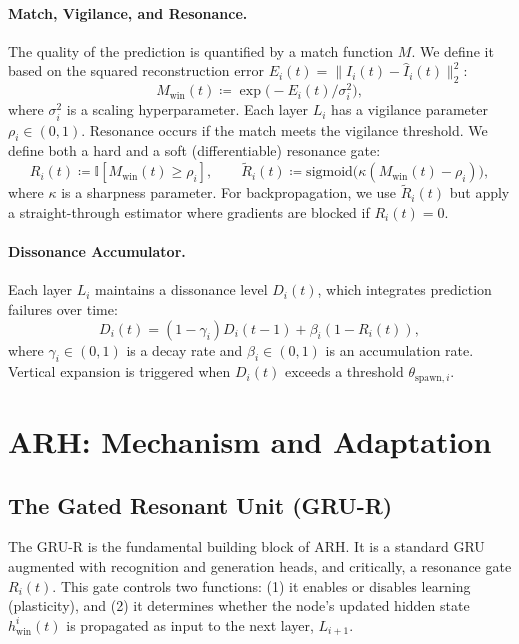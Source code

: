 \documentclass{article}
\begin{document}
\paragraph{Match, Vigilance, and Resonance.} The quality of the prediction is quantified by a match function $M$. We define it based on the squared reconstruction error $E_i(t) = \|I_i(t) - \hat{I}_i(t)\|_2^2$:
\begin{equation}
    M_{\text{win}}(t) \coloneqq \exp\big(-E_i(t) / \sigma_i^2\big),
\end{equation}
where $\sigma_i^2$ is a scaling hyperparameter. Each layer $L_i$ has a vigilance parameter $\rho_i \in (0, 1)$. Resonance occurs if the match meets the vigilance threshold. We define both a hard and a soft (differentiable) resonance gate:
\begin{equation}
    R_i(t) \coloneqq \mathbb{I}[M_{\text{win}}(t) \ge \rho_i], \qquad
    \tilde{R}_i(t) \coloneqq \text{sigmoid}\big(\kappa(M_{\text{win}}(t) - \rho_i)\big),
\end{equation}
where $\kappa$ is a sharpness parameter. For backpropagation, we use $\tilde{R}_i(t)$ but apply a straight-through estimator where gradients are blocked if $R_i(t) = 0$.

\paragraph{Dissonance Accumulator.} Each layer $L_i$ maintains a dissonance level $D_i(t)$, which integrates prediction failures over time:
\begin{equation}
    D_i(t) = (1 - \gamma_i) D_i(t-1) + \beta_i (1 - R_i(t)),
    \label{eq:dissonance}
\end{equation}
where $\gamma_i \in (0,1)$ is a decay rate and $\beta_i \in (0,1)$ is an accumulation rate. Vertical expansion is triggered when $D_i(t)$ exceeds a threshold $\theta_{\text{spawn},i}$.

\section{ARH: Mechanism and Adaptation}

\subsection{The Gated Resonant Unit (GRU-R)}
The GRU-R is the fundamental building block of ARH. It is a standard GRU \citep{gru2014} augmented with recognition and generation heads, and critically, a resonance gate $R_i(t)$. This gate controls two functions: (1) it enables or disables learning (plasticity), and (2) it determines whether the node's updated hidden state $h_{\text{win}}^i(t)$ is propagated as input to the next layer, $L_{i+1}$.
\end{document}
